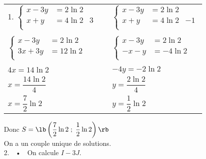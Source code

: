 \begin{tabular}{lcl}
1. $\left\{ \begin{array}{ll|l} 
x -3y &= 2\ln 2& \\
  x +y &= 4 \ln 2& 3 \\
\end{array} \right. $ & \hspace{1cm} & $\left\{ \begin{array}{ll|l} 
x -3y &= 2\ln 2 & \\
  x +y &=  4\ln 2 & -1 \\
\end{array} \right. $ \\
   & & \\
$\left\{ \begin{array}{ll} 
x -3y &=2\ln 2  \\
  3x +3y &=12 \ln 2 \\ 
\end{array} \right. $ & \hspace{1cm} & $\left\{ \begin{array}{ll} 
x -3y &=2\ln 2  \\
  -x -y &=-4 \ln 2 \\ 
\end{array} \right.$ \\
\cline{1-1} \cline{3-3}\\
$4x = 14\ln 2$ & & $-4y=-2\ln 2 $ \vspace*{.3cm} \\
$ x = \dfrac{14\ln 2}{4}$   & & $y=\dfrac{2 \ln 2}{4}$ \vspace*{.3cm} \\
$x = \dfrac{7}{2}\ln 2$ & & $y=\dfrac{1}{2}\ln 2$ \\
\end{tabular}

\vspace*{.3cm}

Donc $S = \lb \left(\dfrac{7}{2}\ln 2 \; ; \; \dfrac{1}{2}\ln 2 \right)\rb$ \\

On a un couple unique de solutions. \\

2. $\;$ • $\;$ On calcule $I - 3J$. \\

